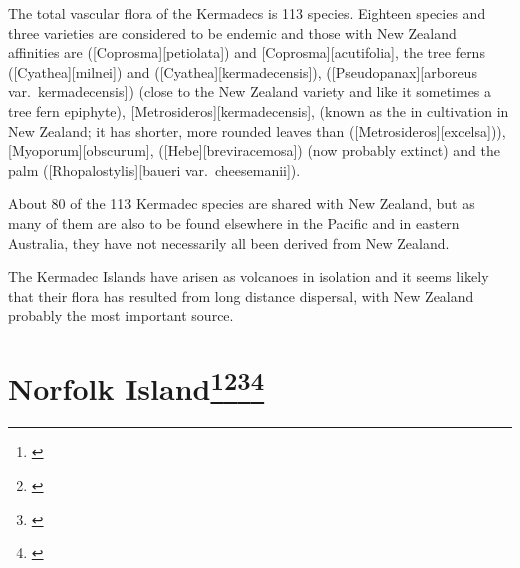 The total vascular flora of the Kermadecs is 113 species.
Eighteen species and three varieties are considered to be endemic and those with New Zealand affinities are  ([Coprosma][petiolata]) and [Coprosma][acutifolia], the tree ferns  ([Cyathea][milnei]) and  ([Cyathea][kermadecensis]),  ([Pseudopanax][arboreus var.\ kermadecensis]) (close to the New Zealand variety and like it sometimes a tree fern epiphyte), [Metrosideros][kermadecensis], (known as the  in cultivation in New Zealand; it has shorter, more rounded leaves than  ([Metrosideros][excelsa])), [Myoporum][obscurum],  ([Hebe][breviracemosa]) (now probably extinct) and the palm  ([Rhopalostylis][baueri var.\ cheesemanii]).

About 80 of the 113 Kermadec species are shared with New Zealand, but as many of them are also to be found elsewhere in the Pacific and in eastern Australia, they have not necessarily all been derived from New Zealand.

The Kermadec Islands have arisen as volcanoes in isolation and it seems likely that their flora has resulted from long distance dispersal, with New Zealand probably the most important source.

\section[Norfolk Island]{Norfolk Island\thinspace\footnote{\cite{laing1915revised}}\footnote{\cite{turner1968conservation}}\footnote{\cite{green1970notes}}\footnote{\cite{green1979observations}}}


